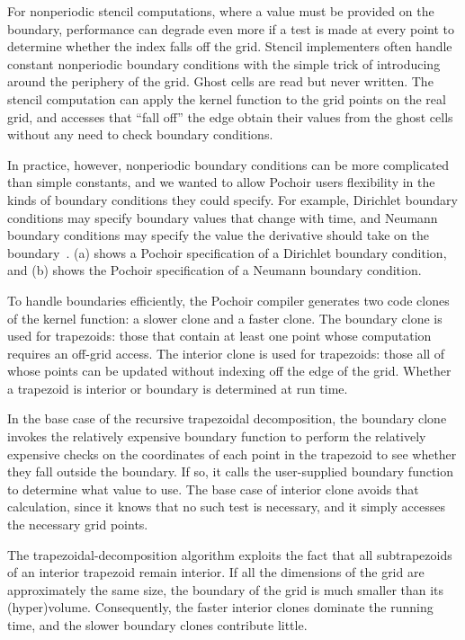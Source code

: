 For nonperiodic stencil computations, where a value must be provided
on the boundary, performance can degrade even more if a test is made
at every point to determine whether the index falls off the grid.
Stencil implementers often handle constant nonperiodic boundary
conditions with the simple trick of introducing 
\cite{Datta09} around the periphery of the grid.  Ghost cells are read
but never written.  The stencil computation can apply the kernel
function to the grid points on the real grid, and accesses that ``fall
off'' the edge obtain their values from the ghost cells without any
need to check boundary conditions.

In practice, however, nonperiodic boundary conditions can be more
complicated than simple constants, and we wanted to allow Pochoir
users flexibility in the kinds of boundary conditions they could
specify.  For example, Dirichlet boundary conditions may specify
boundary values that change with time, and Neumann boundary conditions
may specify the value the derivative should take on the
boundary~\cite{FeshbachMo81}.  (a) shows a Pochoir
specification of a Dirichlet boundary condition, and
(b) shows the Pochoir specification of a Neumann
boundary condition.

To handle boundaries efficiently, the Pochoir compiler generates two
code clones of the kernel function: a slower  clone and
a faster  clone.  The boundary clone is used for
 trapezoids: those that contain at least one point
whose computation requires an off-grid access.  The interior clone is
used for  trapezoids: those all of whose points can be
updated without indexing off the edge of the grid.  Whether a
trapezoid is interior or boundary is determined at run time.

In the base case of the recursive trapezoidal decomposition, the
boundary clone invokes the relatively expensive boundary function to
perform the relatively expensive checks on the coordinates of each
point in the trapezoid to see whether they fall outside the boundary.
If so, it calls the user-supplied boundary function to determine what
value to use.  The base case of interior clone avoids that
calculation, since it knows that no such test is necessary, and it
simply accesses the necessary grid points.

The trapezoidal-decomposition algorithm exploits the fact that all
subtrapezoids of an interior trapezoid remain interior.  If all the
dimensions of the grid are approximately the same size, the boundary
of the grid is much smaller than its (hyper)volume.  Consequently, the
faster interior clones dominate the running time, and the slower
boundary clones contribute little.

